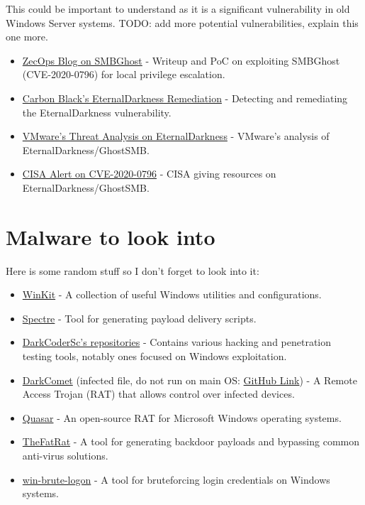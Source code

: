 \documentclass{article}
\begin{document}
This could be important to understand as it is a significant vulnerability in old Windows Server systems.
TODO: add more potential vulnerabilities, explain this one more.

\begin{itemize}
    \item \href{https://blog.zecops.com/research/exploiting-smbghost-cve-2020-0796-for-a-local-privilege-escalation-writeup-and-poc/}{ZecOps Blog on SMBGhost} - Writeup and PoC on exploiting SMBGhost (CVE-2020-0796) for local privilege escalation.
    \item \href{https://github.com/carbonblack/tau-tools/tree/master/remediation/EternalDarkness}{Carbon Black's EternalDarkness Remediation} - Detecting and remediating the EternalDarkness vulnerability.
    \item \href{https://blogs.vmware.com/security/2020/03/threat-analysis-cve-2020-0796-eternaldarkness-ghostsmb.html}{VMware's Threat Analysis on EternalDarkness} - VMware's analysis of EternalDarkness/GhostSMB.
    \item \href{https://www.cisa.gov/news-events/alerts/2020/06/05/unpatched-microsoft-systems-vulnerable-cve-2020-0796}{CISA Alert on CVE-2020-0796} - CISA giving resources on EternalDarkness/GhostSMB.    
\end{itemize}

\section{Malware to look into}
Here is some random stuff so I don't forget to look into it:
\begin{itemize}
    \item \href{https://github.com/0x44F/WinKit}{WinKit} - A collection of useful Windows utilities and configurations.
    \item \href{https://github.com/D4stiny/spectre}{Spectre} - Tool for generating payload delivery scripts.
    \item \href{https://github.com/DarkCoderSc?tab=repositories}{DarkCoderSc's repositories} - Contains various hacking and penetration testing tools, notably ones focused on Windows exploitation.
    \item \href{https://en.wikipedia.org/wiki/DarkComet}{DarkComet} (infected file, do not run on main OS: \href{https://github.com/zxo2004/DarkComet-RAT-5.3.1}{GitHub Link}) - A Remote Access Trojan (RAT) that allows control over infected devices.
    \item \href{https://github.com/quasar/Quasar}{Quasar} - An open-source RAT for Microsoft Windows operating systems.
    \item \href{https://github.com/screetsec/TheFatRat}{TheFatRat} - A tool for generating backdoor payloads and bypassing common anti-virus solutions.
    \item \href{https://github.com/DarkCoderSc/win-brute-logon}{win-brute-logon} - A tool for bruteforcing login credentials on Windows systems.
\end{itemize}
\end{document}
